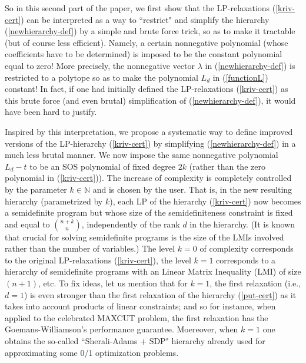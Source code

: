 \documentclass[11pt]{article}
\numberwithin{equation}{section}
\def\N{\mathbb{N}}
\begin{document}
So in this second part of the paper, we first show that the LP-relaxations (\ref{kriv-cert})
can be interpreted as a way to ``restrict"  and simplify the hierarchy (\ref{newhierarchy-def}) by a simple and brute force trick, so as to make it tractable
(but of course less efficient). Namely, a certain nonnegative polynomial (whose coefficients have to be determined) is 
imposed to be the constant polynomial equal to zero! More precisely, the nonnegative vector $\lambda$ in (\ref{newhierarchy-def}) is
restricted to a polytope so as to make the polynomial $L_d$ in (\ref{functionL}) constant!
In fact, if one had initially defined the LP-relaxations (\ref{kriv-cert})
as this brute force (and even brutal) simplification of (\ref{newhierarchy-def}), it would have been hard to justify.

Inspired by this interpretation, we propose a systematic way
to define improved versions of the LP-hierarchy (\ref{kriv-cert})  by simplifying (\ref{newhierarchy-def}) in a much less brutal manner. 
 We now impose the same
 nonnegative polynomial $L_d-t$ to be an SOS polynomial of fixed degree $2k$ (rather than the zero polynomial in (\ref{kriv-cert})).
The increase of complexity is completely controlled by the parameter $k\in\N$ and is chosen by the user.
That is, in the new resulting hierarchy (parametrized by $k$), each LP of the hierarchy (\ref{kriv-cert}) now becomes a semidefinite program but whose
size of the semidefiniteness constraint is fixed and equal to ${n+k\choose n}$, independently
of the rank $d$ in the hierarchy.
(It is known that crucial for solving semidefinite programs is 
the size of the LMIs involved rather than the number of variables.)
The level $k=0$ of complexity corresponds
to the original LP-relaxations (\ref{kriv-cert}), the level $k=1$ corresponds to a hierarchy of semidefinite programs 
with an Linear Matrix Inequality (LMI) of size $(n+1)$, etc.  To fix ideas, 
let us mention that for $k=1$, the first relaxation  (i.e., $d=1$) is even stronger than the first relaxation of the hierarchy (\ref{put-cert})
as it takes into account products of linear constraints; and so for instance,
when applied to the celebrated MAXCUT problem, the first relaxation has the Goemans-Williamson's performance guarantee.
Moereover, when $k=1$ one obtains the so-called ``Sherali-Adams + SDP" hierarchy already used for
approximating some 0/1 optimization problems.
\end{document}
